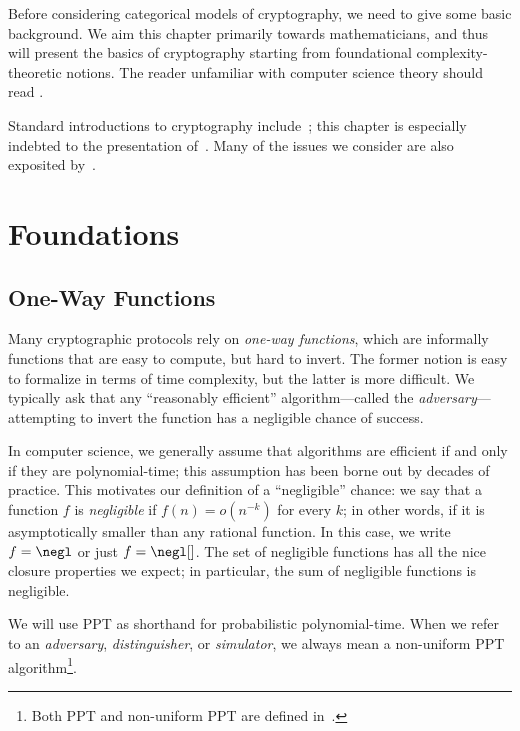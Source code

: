 Before considering categorical models of cryptography, we need to give some
basic background. We aim this chapter primarily towards mathematicians, and thus
will present the basics of cryptography starting from foundational
complexity-theoretic notions. The reader unfamiliar with computer science theory
should read .

Standard introductions to cryptography include~\cite{katz-lindell-2014,
pass-shelat-2020, rosulek-2021}; this chapter is especially indebted to the
presentation of~\cite{pass-shelat-2020}. Many of the issues we consider are also
exposited by~\cite{lindell-2017}.

\section{Foundations}

\subsection{One-Way Functions}

Many cryptographic protocols rely on \emph{one-way functions}, which are
informally functions that are easy to compute, but hard to invert. The former
notion is easy to formalize in terms of time complexity, but the latter is more
difficult. We typically ask that any ``reasonably efficient'' algorithm---called
the \emph{adversary}---attempting to invert the function has a negligible chance
of success.

In computer science, we generally assume that algorithms are efficient if and
only if they are polynomial-time; this assumption has been borne out by decades
of practice. This motivates our definition of a ``negligible'' chance: we say
that a function $f$ is \emph{negligible} if $f(n) = o(n^{-k})$
for every $k$; in other words, if it is asymptotically smaller than any rational
function. In this case, we write $f = \negl$ or just $f = \negl[]$. The set
of negligible functions has all the nice closure properties we expect; in
particular, the sum of negligible functions is negligible.


\begin{ntn}
  We will use PPT as shorthand for probabilistic polynomial-time. When we refer
  to an \emph{adversary}, \emph{distinguisher}, or \emph{simulator}, we always
  mean a non-uniform PPT algorithm\footnote{Both PPT and non-uniform PPT are defined
  in~.}.
\end{ntn}

